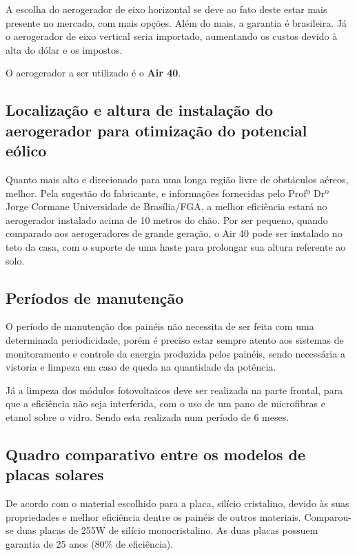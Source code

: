 A escolha do aerogerador de eixo horizontal se deve ao fato deste estar mais presente no mercado, com mais opções. Além do mais, a garantia é brasileira. Já o aerogerador de eixo vertical seria importado, aumentando os custos devido à alta do dólar e os impostos.

	O aerogerador a ser utilizado é o \textbf{Air 40}.


\subsection{Localização e altura de instalação do aerogerador para otimização do potencial eólico}

	Quanto mais alto e direcionado para uma longa região livre de obstáculos aéreos, melhor. Pela sugestão do fabricante, e informações fornecidas pelo Profº Drº Jorge Cormane Universidade de Brasília/FGA, a melhor eficiência estará no aerogerador instalado acima de 10 metros do chão. Por ser pequeno, quando comparado aos aerogeradores de grande geração, o Air 40 pode ser instalado no teto da casa, com o suporte de uma haste para prolongar sua altura referente ao solo.

\subsection{Períodos de manutenção}

	O período de manutenção dos painéis não necessita de ser feita com uma determinada periodicidade, porém é preciso estar sempre atento aos sistemas de monitoramento e controle da energia produzida pelos painéis, sendo necessária a vistoria e limpeza em caso de queda na quantidade da potência.

	Já a limpeza dos módulos fotovoltaicos deve ser realizada na parte frontal, para que a eficiência não seja interferida, com o uso de um pano de microfibras e etanol sobre o vidro. Sendo esta realizada num período de 6 meses.

\subsection{Quadro comparativo entre os modelos de placas solares}

	De acordo com o material escolhido para a placa, silício cristalino, devido às suas propriedades e melhor eficiência dentre os painéis de outros materiais. Comparou-se duas placas de 255\si{\watt} de silício monocristalino. As duas placas possuem garantia de 25 anos (80\% de eficiência).

